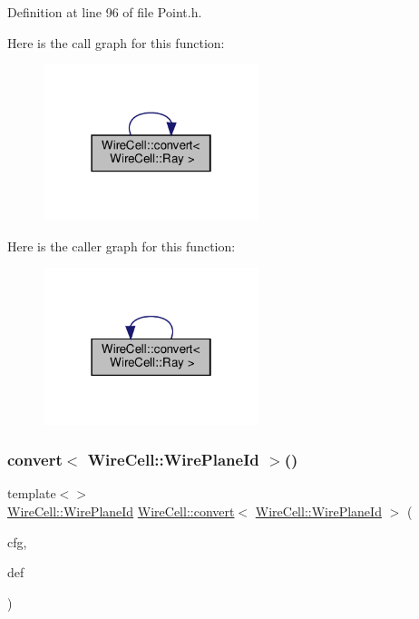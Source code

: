Definition at line 96 of file Point.\+h.

Here is the call graph for this function\+:
\nopagebreak
\begin{figure}[H]
\begin{center}
\leavevmode
\includegraphics[width=178pt]{namespace_wire_cell_a377a84d938ffcb68212b7119171e008d_cgraph}
\end{center}
\end{figure}
Here is the caller graph for this function\+:
\nopagebreak
\begin{figure}[H]
\begin{center}
\leavevmode
\includegraphics[width=178pt]{namespace_wire_cell_a377a84d938ffcb68212b7119171e008d_icgraph}
\end{center}
\end{figure}
\mbox{\label{namespace_wire_cell_ac5c430ec5c4c9bbb7437f281d4094c4f}} 
\subsubsection{\texorpdfstring{convert$<$ Wire\+Cell\+::\+Wire\+Plane\+Id $>$()}{convert< WireCell::WirePlaneId >()}}
{\footnotesize\ttfamily template$<$$>$ \\
\hyperlink{class_wire_cell_1_1_wire_plane_id}{Wire\+Cell\+::\+Wire\+Plane\+Id} \hyperlink{namespace_wire_cell_a5f6648d6ae801b20a17b8a35fd3306e5}{Wire\+Cell\+::convert}$<$ \hyperlink{class_wire_cell_1_1_wire_plane_id}{Wire\+Cell\+::\+Wire\+Plane\+Id} $>$ (\begin{DoxyParamCaption}\item[{const \hyperlink{namespace_wire_cell_a9f705541fc1d46c608b3d32c182333ee}{Configuration} \&}]{cfg,  }\item[{const \hyperlink{class_wire_cell_1_1_wire_plane_id}{Wire\+Cell\+::\+Wire\+Plane\+Id} \&}]{def }\end{DoxyParamCaption})\hspace{0.3cm}{\ttfamily [inline]}}



